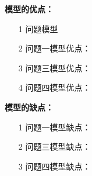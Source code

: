 \documentclass{cumcmthesis}
\begin{document}
\textbf{模型的优点：}
\begin{itemize}
	\item[1] 问题模型
	\item[2] 问题一模型优点：
	\item[3] 问题三模型优点：
	\item[4] 问题四模型优点：
\end{itemize}

\textbf{模型的缺点：}
\begin{itemize}
	\item[1] 问题一模型缺点：
	\item[2] 问题三模型缺点：
	\item[3] 问题四模型缺点：
\end{itemize}

\newpage

\end{document}
